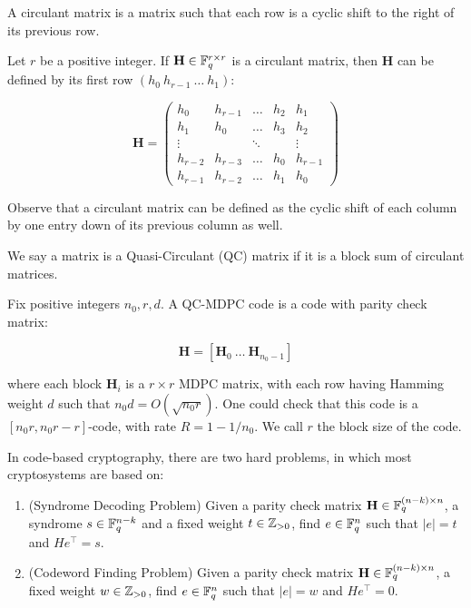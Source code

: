 \begin{defn}
A circulant matrix is a matrix such that each row is a cyclic shift to the right of its previous row. 

Let $r$ be a positive integer. If $\mathbf{H} \in \mathbb{F}_q^{r \times r}$ is a circulant matrix, then $\mathbf{H}$ can be defined by its first row $( h_0 \ h_{r-1} \ \ldots \ h_1)$:

\[
\mathbf{H} = \begin{pmatrix}
h_0 & h_{r-1} & \ldots & h_2 & h_1 \\
h_1 & h_0 & \ldots & h_3 & h_2 \\
\vdots &  & \ddots & & \vdots \\
h_{r-2} & h_{r-3} & \ldots & h_0 & h_{r-1} \\
h_{r-1} & h_{r-2} & \ldots & h_1 & h_0 
\end{pmatrix}
\]

Observe that a circulant matrix can be defined as the cyclic shift of each column by one entry down of its previous column as well.

We say a matrix is a Quasi-Circulant (QC) matrix if it is a block sum of circulant matrices.
\end{defn}

\begin{defn}
Fix positive integers $n_0,r,d$. A QC-MDPC code is a code with parity check matrix:

\[
\mathbf{H} = [ \mathbf{H}_0 \  \ldots \ \mathbf{H}_{n_0 -1} ] 
\]

where each block $\mathbf{H}_i$ is a $r \times r$ MDPC matrix, with each row having Hamming weight $d$ such that $n_0d = O(\sqrt{n_0 r})$. One could check that this code is a $[n_0 r, n_0 r - r]$-code, with rate $R = 1 - 1/n_0$. We call $r$ the block size of the code.
\end{defn}

In code-based cryptography, there are two hard problems, in which most cryptosystems are based on:

\begin{enumerate}
\item (Syndrome Decoding Problem) Given a parity check matrix $\mathbf{H} \in \mathbb{F}_q^{(n-k) \times n }$, a syndrome $s \in \mathbb{F}_q^{n-k}$ and a fixed weight $t \in \mathbb{Z}_{>0}$, find $e \in \mathbb{F}_q^n$ such that $|e| = t$ and $He^\top = s$.
\item (Codeword Finding Problem) Given a parity check matrix $\mathbf{H} \in \mathbb{F}_q^{(n-k) \times n }$, a fixed weight $w \in \mathbb{Z}_{>0}$, find $e \in \mathbb{F}_q^n$ such that $|e| = w$ and $He^\top = 0$.
\end{enumerate}

